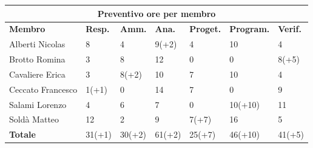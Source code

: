 \documentclass[a4paper, 12pt]{article}
\begin{document}
\begin{center}
	\begin{tabularx}{\textwidth}{|X|X|X|X|X|X|X|}
		\hline
		\multicolumn{7}{|c|}{\textbf{Preventivo ore per membro}}                                            \\
		\hline
		\hline
		\textbf{Membro}   & \textbf{Resp.}    & \textbf{Amm.}   & \textbf{Ana.} &
		\textbf{Proget.}  & \textbf{Program.} & \textbf{Verif.}                                             \\
		\hline
		Alberti Nicolas   & 8                 & 4               & 9(+2)         & 4      & 10      & 4      \\
		\hline
		Brotto Romina     & 3                 & 8               & 12            & 0      & 0       & 8(+5)  \\
		\hline
		Cavaliere Erica   & 3                 & 8(+2)           & 10            & 7      & 10      & 4      \\
		\hline
		Ceccato Francesco & 1(+1)             & 0               & 14            & 7      & 0       & 9      \\
		\hline
		Salami Lorenzo    & 4                 & 6               & 7             & 0      & 10(+10) & 11     \\
		\hline
		Soldà Matteo      & 12                & 2               & 9             & 7(+7)  & 16      & 5      \\
		\hline
		\hline
		\textbf{Totale}   & 31(+1)            & 30(+2)          & 61(+2)        & 25(+7) & 46(+10) & 41(+5) \\
		\hline
	\end{tabularx}\\[8pt]
	\mbox{}\\
\end{center}

\newpage
\end{document}
